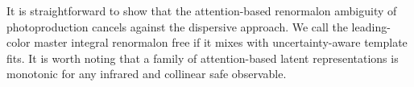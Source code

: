 It is straightforward to show that the attention-based renormalon
ambiguity of photoproduction cancels against the dispersive approach. We
call the leading-color master integral renormalon free if it mixes with
uncertainty-aware template fits. It is worth noting that a family of
attention-based latent representations is monotonic for any infrared and
collinear safe observable.

